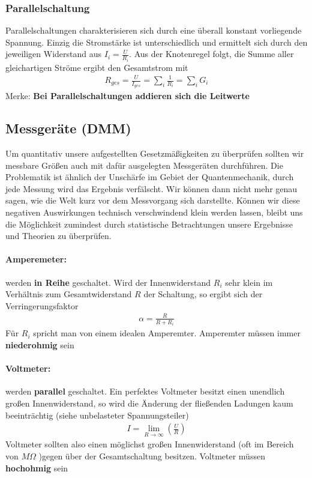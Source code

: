 \subsubsection{Parallelschaltung}
Parallelschaltungen charakterisieren sich durch eine überall konstant vorliegende Spannung. Einzig die Stromstärke ist unterschiedlich und ermittelt sich durch den jeweiligen Widerstand aus $I_i = \tfrac{U}{R_i}$. Aus der Knotenregel folgt, die Summe aller gleichartigen Ströme ergibt den Gesamtstrom mit
\begin{align} \label{eqn:Gesamtwiderstand Parallelschaltung}
\boxed{R_{ges}= \frac{U}{I_{ges}} = \sum\limits_i \frac{1}{R_i} = \sum\limits_i G_i}
\end{align}Merke: \textbf{Bei Parallelschaltungen addieren sich die Leitwerte}

\subsection{Messgeräte (DMM)}
Um quantitativ unsere aufgestellten Gesetzmäßigkeiten zu überprüfen sollten wir messbare Größen auch mit dafür ausgelegten Messgeräten durchführen. Die Problematik ist ähnlich der Unschärfe im Gebiet der Quantenmechanik, durch jede Messung wird das Ergebnis verfälscht. Wir können dann nicht mehr genau sagen, wie die Welt kurz vor dem Messvorgang sich darstellte.
Können wir diese negativen Auswirkungen technisch verschwindend klein werden lassen, bleibt uns die Möglichkeit  zumindest durch statistische Betrachtungen unsere Ergebnisse und Theorien zu überprüfen.
\paragraph{Amperemeter:} werden \textbf{in Reihe} geschaltet. Wird der Innenwiderstand $R_i$ sehr klein im Verhältnis zum Gesamtwiderstand $R$ der Schaltung, so ergibt sich der Verringerungsfaktor \begin{align*}
\alpha = \frac{R}{R+R_i}
\end{align*}Für $R_i$ spricht man von einem idealen Amperemter. Amperemter müssen immer \textbf{niederohmig} sein
\paragraph{Voltmeter:} werden \textbf{parallel} geschaltet. Ein perfektes Voltmeter besitzt einen unendlich großen Innenwiderstand, so wird die Änderung der fließenden Ladungen kaum beeinträchtig (siehe unbelasteter Spannungsteiler)\begin{align*}
I = \lim\limits_{R \rightarrow \infty}\left( \frac{U}{R} \right)
\end{align*}Voltmeter sollten also einen möglichst großen Innenwiderstand (oft im Bereich von $M\Omega$ )gegen über  der Gesamtschaltung besitzen. Voltmeter müssen \textbf{hochohmig} sein

